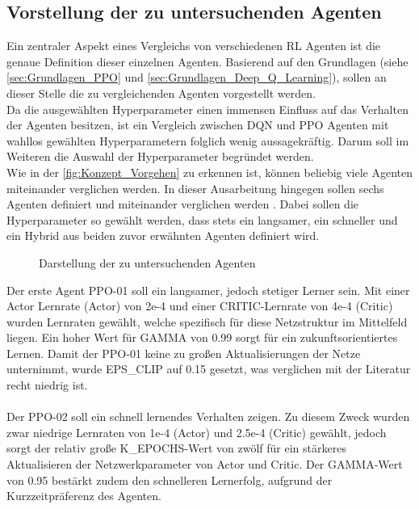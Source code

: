 \subsection{Vorstellung der zu untersuchenden Agenten} \label{subsec:Konzept_Vorstellung_Agenten}
Ein zentraler Aspekt eines Vergleichs von verschiedenen RL Agenten ist die genaue Definition dieser einzelnen Agenten. 
Basierend auf den Grundlagen (siehe \autoref{sec:Grundlagen_PPO} und \autoref{sec:Grundlagen_Deep_Q_Learning}), sollen an dieser Stelle die zu vergleichenden Agenten vorgestellt werden.\\
Da die ausgewählten Hyperparameter einen immensen Einfluss auf das Verhalten der Agenten besitzen, ist ein Vergleich zwischen DQN und PPO Agenten mit wahllos gewählten Hyperparametern folglich wenig aussagekräftig. Darum soll im Weiteren die Auswahl der Hyperparameter begründet werden.\\
Wie in der \autoref{fig:Konzept_Vorgehen} zu erkennen ist, können beliebig viele Agenten miteinander verglichen werden. In dieser Ausarbeitung hingegen sollen sechs Agenten definiert und miteinander verglichen werden . Dabei sollen die Hyperparameter so gewählt werden, dass stets ein langsamer, ein schneller und ein Hybrid aus beiden zuvor erwähnten Agenten definiert wird.
\begin{figure}[H]
	\centering
	
	\caption[Agenten]{Darstellung der zu untersuchenden Agenten}
	\label{fig:Konzept_Agenten}
\end{figure}
Der erste Agent PPO-01 soll ein langsamer, jedoch stetiger Lerner sein. Mit einer Actor Lernrate (Actor) von 2e-4 und einer CRITIC-Lernrate von 4e-4 (Critic) wurden Lernraten gewählt, welche spezifisch für diese Netzstruktur im Mittelfeld liegen. Ein hoher Wert für GAMMA von 0.99 sorgt für ein zukunftsorientiertes Lernen. Damit der PPO-01 keine zu großen Aktualisierungen der Netze unternimmt, wurde EPS\_CLIP auf 0.15 gesetzt, was verglichen mit der Literatur \cite[S. 6]{PPO} recht niedrig ist.\\
\\Der PPO-02 soll ein schnell lernendes Verhalten zeigen. Zu diesem Zweck wurden zwar niedrige Lernraten von 1e-4 (Actor) und 2.5e-4 (Critic) gewählt, jedoch sorgt der relativ große K\_EPOCHS-Wert von zwölf für ein stärkeres Aktualisieren der Netzwerkparameter von Actor und Critic. Der GAMMA-Wert von 0.95 bestärkt zudem den schnelleren Lernerfolg, aufgrund der Kurzzeitpräferenz des Agenten.\\
